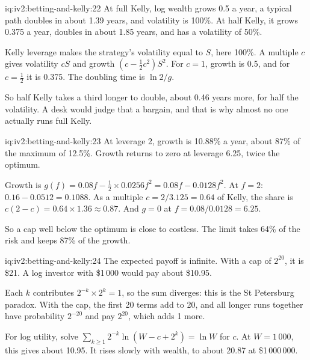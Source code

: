 \begin{solution}{iq:iv2:betting-and-kelly:22}
At full Kelly, log wealth grows 0.5 a year, a typical path doubles in about 1.39 years, and volatility is 100\%. At half Kelly, it grows 0.375 a year, doubles in about 1.85 years, and has a volatility of 50\%.

Kelly leverage makes the strategy's volatility equal to $S$, here 100\%. A multiple $c$ gives volatility $cS$ and growth $(c - \tfrac12 c^2)S^2$. For $c = 1$, growth is 0.5, and for $c = \tfrac12$ it is 0.375. The doubling time is $\ln 2/g$.

So half Kelly takes a third longer to double, about 0.46 years more, for half the volatility. A desk would judge that a bargain, and that is why almost no one actually runs full Kelly.

\end{solution}

\begin{solution}{iq:iv2:betting-and-kelly:23}
At leverage 2, growth is 10.88\% a year, about 87\% of the maximum of 12.5\%. Growth returns to zero at leverage 6.25, twice the optimum.

Growth is $g(f) = 0.08f - \tfrac12 \times 0.0256f^2 = 0.08f - 0.0128f^2$. At $f = 2$: $0.16 - 0.0512 = 0.1088$. As a multiple $c = 2/3.125 = 0.64$ of Kelly, the share is $c(2 - c) = 0.64 \times 1.36 \approx 0.87$. And $g = 0$ at $f = 0.08/0.0128 = 6.25$.

So a cap well below the optimum is close to costless. The limit takes 64\% of the risk and keeps 87\% of the growth.

\end{solution}

\begin{solution}{iq:iv2:betting-and-kelly:24}
The expected payoff is infinite. With a cap of $2^{20}$, it is \$21. A log investor with \$1\,000 would pay about \$10.95.

Each $k$ contributes $2^{-k} \times 2^k = 1$, so the sum diverges: this is the St Petersburg paradox. With the cap, the first 20 terms add to 20, and all longer runs together have probability $2^{-20}$ and pay $2^{20}$, which adds 1 more.

For log utility, solve $\sum_{k \geq 1}2^{-k}\ln(W - c + 2^k) = \ln W$ for $c$. At $W = 1\,000$, this gives about 10.95. It rises slowly with wealth, to about 20.87 at \$1\,000\,000.

\end{solution}

